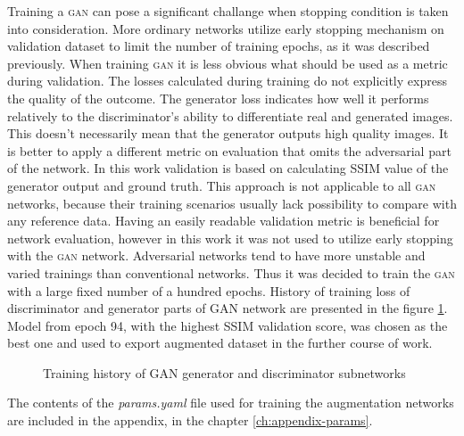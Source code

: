 Training a \textsc{gan} can pose a significant challange when stopping condition is taken into consideration.
More ordinary networks utilize early stopping mechanism on validation dataset to limit the number of training epochs, as it was described previously.
When training \textsc{gan} it is less obvious what should be used as a metric during validation.
The losses calculated during training do not explicitly express the quality of the outcome.
The generator loss indicates how well it performs relatively to the discriminator's ability to differentiate real and generated images.
This doesn't necessarily mean that the generator outputs high quality images.
It is better to apply a different metric on evaluation that omits the adversarial part of the network.
In this work validation is based on calculating SSIM value of the generator output and ground truth.
This approach is not applicable to all \textsc{gan} networks, because their training scenarios usually lack possibility to compare with any reference data.
Having an easily readable validation metric is beneficial for network evaluation, however in this work it was not used to utilize early stopping with the \textsc{gan} network.
Adversarial networks tend to have more unstable and varied trainings than conventional networks.
Thus it was decided to train the \textsc{gan} with a large fixed number of a hundred epochs.
History of training loss of discriminator and generator parts of GAN network are presented in the figure \ref{fig:gan-train-hist}.
Model from epoch 94, with the highest SSIM validation score, was chosen as the best one and used to export augmented dataset in the further course of work.
\begin{figure}
    \centering
    \caption{Training history of GAN generator and discriminator subnetworks}
    \label{fig:gan-train-hist}
\end{figure}

The contents of the \textit{params.yaml} file used for training the augmentation networks are included in the appendix, in the chapter \ref{ch:appendix-params}.

